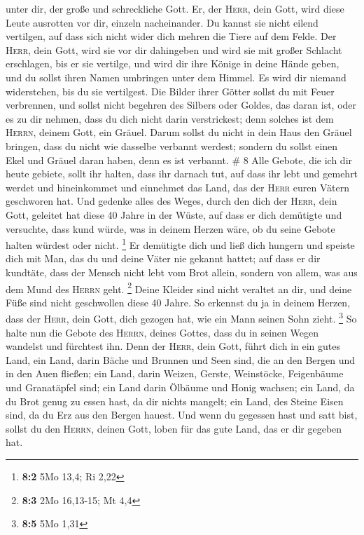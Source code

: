 unter dir, der große und schreckliche Gott.  Er, der
\textsc{Herr}, dein Gott, wird diese Leute ausrotten vor dir, einzeln
nacheinander. Du kannst sie nicht eilend vertilgen, auf dass sich nicht
wider dich mehren die Tiere auf dem Felde.  Der
\textsc{Herr}, dein Gott, wird sie vor dir dahingeben und wird sie mit
großer Schlacht erschlagen, bis er sie vertilge,  und
wird dir ihre Könige in deine Hände geben, und du sollst ihren Namen
umbringen unter dem Himmel. Es wird dir niemand widerstehen, bis du sie
vertilgest.  Die Bilder ihrer Götter sollst du mit Feuer
verbrennen, und sollst nicht begehren des Silbers oder Goldes, das daran
ist, oder es zu dir nehmen, dass du dich nicht darin verstrickest; denn
solches ist dem \textsc{Herrn}, deinem Gott, ein Gräuel. 
Darum sollst du nicht in dein Haus den Gräuel bringen, dass du nicht wie
dasselbe verbannt werdest; sondern du sollst einen Ekel und Gräuel daran
haben, denn es ist verbannt. \# 8  Alle Gebote, die ich
dir heute gebiete, sollt ihr halten, dass ihr darnach tut, auf dass ihr
lebt und gemehrt werdet und hineinkommet und einnehmet das Land, das der
\textsc{Herr} euren Vätern geschworen hat.  Und gedenke
alles des Weges, durch den dich der \textsc{Herr}, dein Gott, geleitet
hat diese 40 Jahre in der Wüste, auf dass er dich demütigte und
versuchte, dass kund würde, was in deinem Herzen wäre, ob du seine
Gebote halten würdest oder nicht. \footnote{\textbf{8:2} 5Mo 13,4; Ri
  2,22}  Er demütigte dich und ließ dich hungern und
speiste dich mit Man, das du und deine Väter nie gekannt hattet; auf
dass er dir kundtäte, dass der Mensch nicht lebt vom Brot allein,
sondern von allem, was aus dem Mund des \textsc{Herrn} geht. \footnote{\textbf{8:3}
  2Mo 16,13-15; Mt 4,4}  Deine Kleider sind nicht veraltet
an dir, und deine Füße sind nicht geschwollen diese 40 Jahre.
 So erkennst du ja in deinem Herzen, dass der
\textsc{Herr}, dein Gott, dich gezogen hat, wie ein Mann seinen Sohn
zieht. \footnote{\textbf{8:5} 5Mo 1,31}  So halte nun die
Gebote des \textsc{Herrn}, deines Gottes, dass du in seinen Wegen
wandelst und fürchtest ihn.  Denn der \textsc{Herr}, dein
Gott, führt dich in ein gutes Land, ein Land, darin Bäche und Brunnen
und Seen sind, die an den Bergen und in den Auen fließen; 
ein Land, darin Weizen, Gerste, Weinstöcke, Feigenbäume und Granatäpfel
sind; ein Land darin Ölbäume und Honig wachsen;  ein Land,
da du Brot genug zu essen hast, da dir nichts mangelt; ein Land, des
Steine Eisen sind, da du Erz aus den Bergen hauest.  Und
wenn du gegessen hast und satt bist, sollst du den \textsc{Herrn},
deinen Gott, loben für das gute Land, das er dir gegeben hat.

